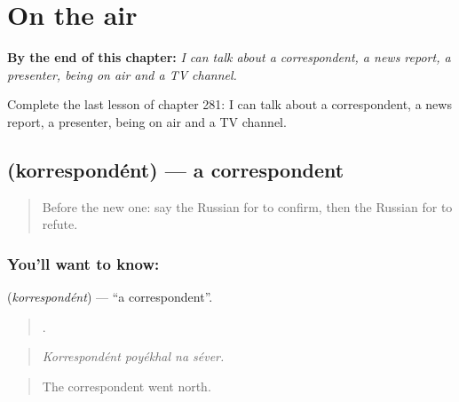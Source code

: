 
\chapter{On the air}
\label{ch:ru-on-the-air}

\begin{chapteropening}
\textbf{By the end of this chapter:} \emph{I can talk about a correspondent, a news report, a presenter, being on air and a TV channel.}

Complete the last lesson of chapter 281: I can talk about a correspondent, a news report, a presenter, being on air and a TV channel.
\end{chapteropening}

\section[\texorpdfstring{\ru{корреспондент} (korrespondént)}{корреспондент (korrespondént)}]{ (korrespondént) — a correspondent}

\label{lesson:RU-C281-korrespondent}



\begin{quote}
Before the new one: say the Russian for to confirm, then the Russian for to refute.
\end{quote}

\subsection*{You'll want to know: }
\textbf{} (\emph{korrespondént}) — \textquotedblleft{}a correspondent\textquotedblright{}.

\begin{quote}
   .
\end{quote}

\begin{quote}
\emph{Korrespondént poyékhal na séver.}
\end{quote}

\begin{quote}
The correspondent went north.
\end{quote}

